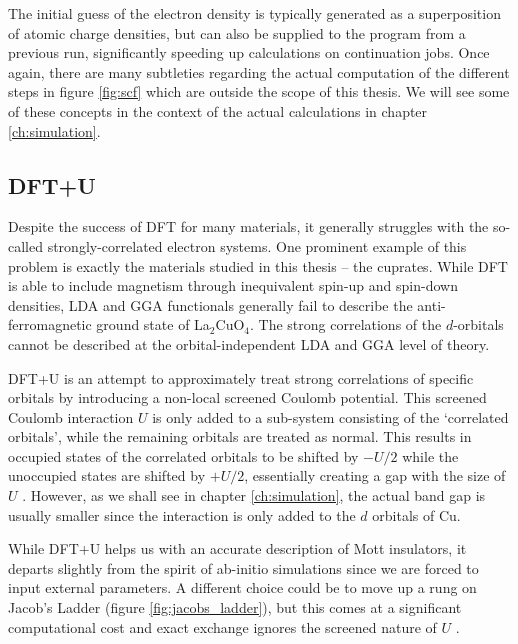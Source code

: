 The initial guess of the electron density is typically generated as a superposition of atomic charge densities, but can also be supplied to the program from a previous run, significantly speeding up calculations on continuation jobs. Once again, there are many subtleties regarding the actual computation of the different steps in figure \ref{fig:scf} which are outside the scope of this thesis. We will see some of these concepts in the context of the actual calculations in chapter \ref{ch:simulation}.

\subsection{DFT+U}\label{sec:ldau}
Despite the success of DFT for many materials, it generally struggles with the so-called strongly-correlated electron systems. One prominent example of this problem is exactly the materials studied in this thesis -- the cuprates. While DFT is able to include magnetism through inequivalent spin-up and spin-down densities, LDA and GGA functionals generally fail to describe the anti-ferromagnetic ground state of La$_2$CuO$_4$. The strong correlations of the $d$-orbitals cannot be described at the orbital-independent LDA and GGA level of theory.

DFT+U is an attempt to approximately treat strong correlations of specific orbitals by introducing a non-local screened Coulomb potential. This screened Coulomb interaction $U$ is only added to a sub-system consisting of the `correlated orbitals', while the remaining orbitals are treated as normal. This results in occupied states of the correlated orbitals to be shifted by $-U/2$ while the unoccupied states are shifted by $+U/2$, essentially creating a gap with the size of $U$ \cite{Anisimov1997}. However, as we shall see in chapter \ref{ch:simulation}, the actual band gap is usually smaller since the interaction is only added to the $d$ orbitals of Cu.

While DFT+U helps us with an accurate description of Mott insulators, it departs slightly from the spirit of ab-initio simulations since we are forced to input external parameters. A different choice could be to move up a rung on Jacob's Ladder (figure \ref{fig:jacobs_ladder}), but this comes at a significant computational cost and exact exchange ignores the screened nature of $U$ \cite{Anisimov1997}.

